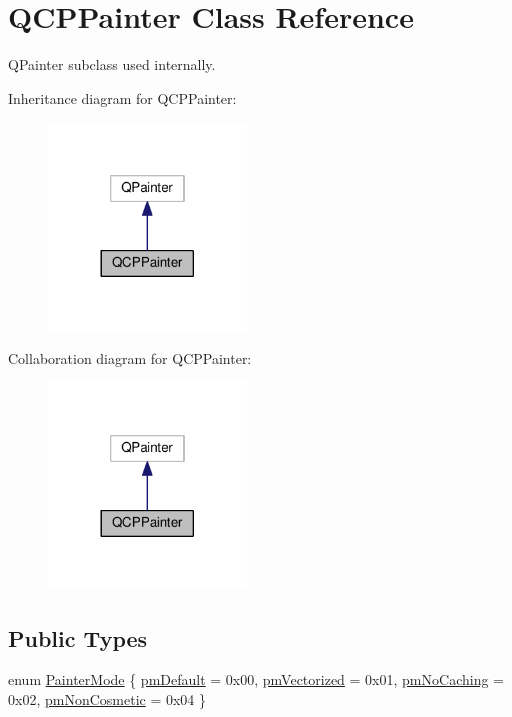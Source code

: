 \hypertarget{classQCPPainter}{}\section{Q\+C\+P\+Painter Class Reference}
\label{classQCPPainter}


Q\+Painter subclass used internally.  




Inheritance diagram for Q\+C\+P\+Painter\+:
\nopagebreak
\begin{figure}[H]
\begin{center}
\leavevmode
\includegraphics[width=149pt]{classQCPPainter__inherit__graph}
\end{center}
\end{figure}


Collaboration diagram for Q\+C\+P\+Painter\+:
\nopagebreak
\begin{figure}[H]
\begin{center}
\leavevmode
\includegraphics[width=149pt]{classQCPPainter__coll__graph}
\end{center}
\end{figure}
\subsection*{Public Types}
\begin{DoxyCompactItemize}
\item 
enum \hyperlink{classQCPPainter_a156cf16444ff5e0d81a73c615fdb156d}{Painter\+Mode} \{ \hyperlink{classQCPPainter_a156cf16444ff5e0d81a73c615fdb156da3bac5e87e3d58553b297befb4eee2a45}{pm\+Default} = 0x00, 
\hyperlink{classQCPPainter_a156cf16444ff5e0d81a73c615fdb156daeda679cd55dcd468341d07d48a30b6ab}{pm\+Vectorized} = 0x01, 
\hyperlink{classQCPPainter_a156cf16444ff5e0d81a73c615fdb156dae78f9a4eb277a5f9207f50850a51a0b0}{pm\+No\+Caching} = 0x02, 
\hyperlink{classQCPPainter_a156cf16444ff5e0d81a73c615fdb156dac1e481bfaf408f2bd2eaad3ec341f36b}{pm\+Non\+Cosmetic} = 0x04
 \}
\end{DoxyCompactItemize}
